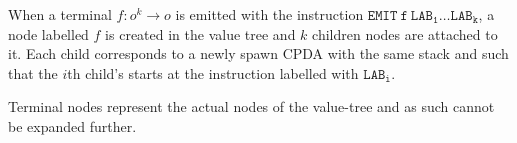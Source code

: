 \documentclass{article}
\begin{document}
When a terminal $f:o^k\rightarrow o$ is emitted with the instruction
$\mathtt{EMIT\ f\ LAB_1 \ldots LAB_k}$, a node labelled $f$ is created in the value tree and $k$ children nodes are attached to it. Each child corresponds to a newly spawn CPDA with the same stack
and such that the $i$th child's starts at the instruction labelled with $\mathtt{LAB_i}$.

Terminal nodes represent the actual nodes of the value-tree and as such cannot be expanded further.
 


\end{document}

